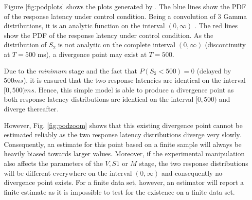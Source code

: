 Figure \ref{fig:podplots} shows the plots generated by . The blue lines show the PDF
of the response latency under control condition. Being a convolution of 3 Gamma distributions, it 
is an analytic function on the interval $(0,\infty)$ \citep{Gelooven1999}. The red lines show the 
PDF of the response latency under control condition. As the distribution of $S_2$ is not analytic on 
the complete interval $(0,\infty)$ (discontinuity at $T=500$ ms), a divergence point may exist at 
$T=500$. 

Due to the \emph{minimum} stage and the fact that $P(S_2<500)=0$ (delayed by 
$500 ms$), it is ensured that the two response latencies are identical on the interval $[0,500) ms$.
Hence, this simple model is able to produce a divergence point as both response-latency distributions are identical
on the interval $[0,500)$ and diverge thereafter.

However, Fig. \ref{fig:podzoom} shows that this existing divergence point cannot be estimated reliably as the two 
response latency distributions diverge very slowly. Consequently, an estimate for this point \cite[e.g. by means of 
estimators proposed in][]{Reingold2012} based on a finite sample will always be heavily biased towards larger
values. Moreover, if the experimental manipulation also affects the parameters of the $V, S1$ or 
$M$ stage, the two response distributions will be different everywhere on the interval $(0,\infty)$ and consequently 
no divergence point exists. For a finite data set, however, an estimator \cite[like][]{Reingold2012} will report a finite 
estimate as it is impossible to test for the existence on a finite data set. 
